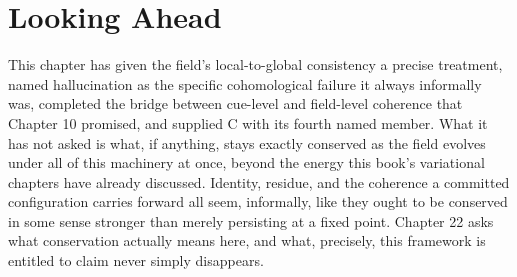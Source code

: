\section{Looking Ahead}

This chapter has given the field's local-to-global consistency a precise treatment, named hallucination as the specific cohomological failure it always informally was, completed the bridge between cue-level and field-level coherence that Chapter 10 promised, and supplied C with its fourth named member. What it has not asked is what, if anything, stays exactly conserved as the field evolves under all of this machinery at once, beyond the energy this book's variational chapters have already discussed. Identity, residue, and the coherence a committed configuration carries forward all seem, informally, like they ought to be conserved in some sense stronger than merely persisting at a fixed point. Chapter 22 asks what conservation actually means here, and what, precisely, this framework is entitled to claim never simply disappears.
